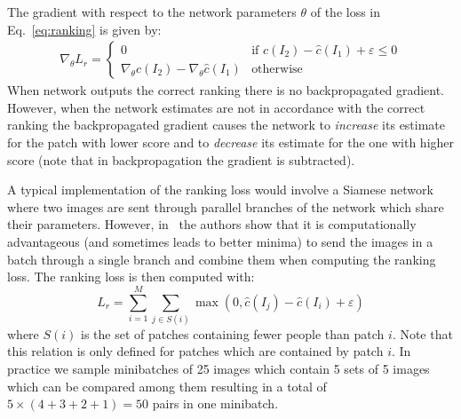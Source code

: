\documentclass[10pt,twocolumn,letterpaper]{article}
\begin{document}
The gradient with respect to the network parameters $\theta$ of the
loss in Eq.~\ref{eq:ranking} is given by:
\begin{eqnarray}
\nabla_{\theta} L_r \! = \!
\begin{cases}
0 & \!\!\! \mbox{if } \hat c \left(I_2\right) \! - \! \hat c \left(I_1\right) + \varepsilon \le 0 \\
\nabla_{\theta}\hat c \left(I_2\right)-\nabla_{\theta}\hat c \left(I_1\right) & \!\!\! \mbox{otherwise} 
\end{cases}
\end{eqnarray}
When network outputs the correct ranking there is no backpropagated
gradient. However, when the network estimates are not in accordance
with the correct ranking the backpropagated gradient causes the
network to \emph{increase} its estimate for the patch with lower score
and to \emph{decrease} its estimate for the one with higher score
(note that in backpropagation the gradient is subtracted).


A typical implementation of the ranking loss would involve a Siamese network~\cite{chopra2005learning} where two images are sent through parallel branches of the network which share their parameters. However, in~\cite{liu2017rankiqa} the authors show that it is computationally advantageous (and sometimes leads to better minima) to send the images in a batch through a single branch and combine them when computing the ranking loss. The ranking loss is then computed with:
\begin{equation} \label{eq:ranking-fast}
L_r = \sum _{ i=1 }^{ M }\sum _{j \in S\left(i\right)} \max{(0,\hat c \left(I_j\right)-\hat c\left(I_i\right)+\varepsilon )}
\end{equation}
where $S\left(i\right)$ is the set of patches containing fewer people than patch $i$. Note that this relation is only defined for patches which are contained by patch $i$. In practice we sample minibatches of 25 images which contain 5 sets of 5 images which can be compared among them resulting in a total of $5\times\left(4+3+2+1\right)=50$ pairs in one minibatch.
\end{document}
